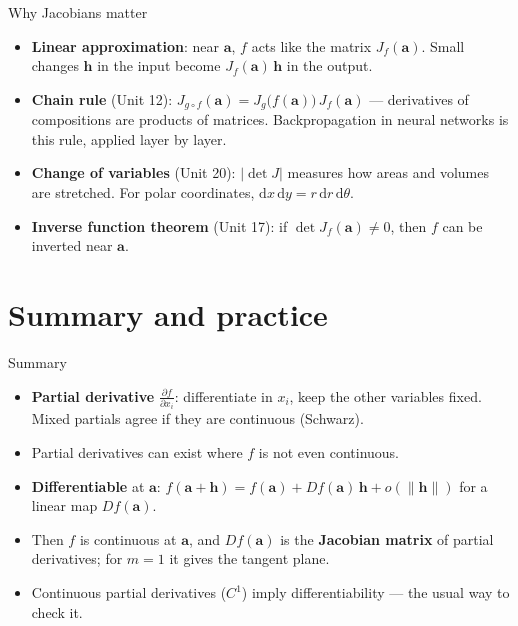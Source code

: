 \documentclass[10pt]{wosm-slides}
\newcommand{\norm}[1]{\lVert #1 \rVert}
\newcommand{\va}{\mathbf{a}}
\newcommand{\vh}{\mathbf{h}}
\newcommand{\pd}[2]{\frac{\partial #1}{\partial #2}}
\begin{document}
\begin{frame}{Why Jacobians matter}
  \begin{itemize}
    \item \textbf{Linear approximation}: near $\va$, $f$ acts like the matrix $J_f(\va)$. Small
      changes $\vh$ in the input become $J_f(\va)\,\vh$ in the output.
    \item \textbf{Chain rule} (Unit 12): $J_{g \circ f}(\va) = J_g\bigl(f(\va)\bigr)\, J_f(\va)$ ---
      derivatives of compositions are products of matrices. Backpropagation in neural networks
      is this rule, applied layer by layer.
    \item \textbf{Change of variables} (Unit 20): $|\det J|$ measures how areas and volumes are
      stretched. For polar coordinates, $\mathrm{d}x\,\mathrm{d}y = r\,\mathrm{d}r\,\mathrm{d}\theta$.
    \item \textbf{Inverse function theorem} (Unit 17): if $\det J_f(\va) \ne 0$, then $f$ can be
      inverted near $\va$.
  \end{itemize}
\end{frame}

\section{Summary and practice}

\begin{frame}{Summary}
  \begin{itemize}
    \item \textbf{Partial derivative} $\pd{f}{x_i}$: differentiate in $x_i$, keep the other variables
      fixed. Mixed partials agree if they are continuous (Schwarz).
    \item Partial derivatives can exist where $f$ is not even continuous.
    \item \textbf{Differentiable} at $\va$: $f(\va + \vh) = f(\va) + Df(\va)\,\vh + o(\norm{\vh})$
      for a linear map $Df(\va)$.
    \item Then $f$ is continuous at $\va$, and $Df(\va)$ is the \textbf{Jacobian matrix} of partial
      derivatives; for $m = 1$ it gives the tangent plane.
    \item Continuous partial derivatives ($C^1$) imply differentiability --- the usual way to check it.
  \end{itemize}
\end{frame}
\end{document}
